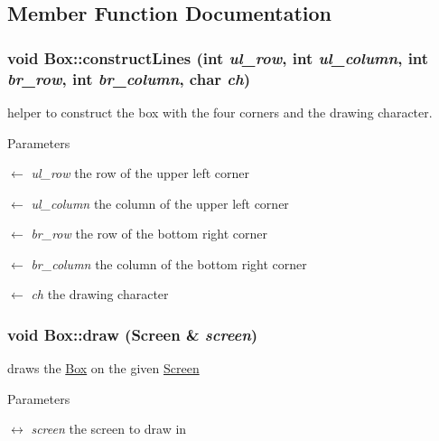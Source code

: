 \subsection{Member Function Documentation}
\hypertarget{classBox_a5411fa40529560030450d1eee001623d}{
\subsubsection[{constructLines}]{\setlength{\rightskip}{0pt plus 5cm}void Box::constructLines (int {\em ul\_\-row}, \/  int {\em ul\_\-column}, \/  int {\em br\_\-row}, \/  int {\em br\_\-column}, \/  char {\em ch})}}
\label{classBox_a5411fa40529560030450d1eee001623d}
helper to construct the box with the four corners and the drawing character.


\begin{DoxyParams}{Parameters}
\item[\mbox{$\leftarrow$} {\em ul\_\-row}]the row of the upper left corner \item[\mbox{$\leftarrow$} {\em ul\_\-column}]the column of the upper left corner \item[\mbox{$\leftarrow$} {\em br\_\-row}]the row of the bottom right corner \item[\mbox{$\leftarrow$} {\em br\_\-column}]the column of the bottom right corner \item[\mbox{$\leftarrow$} {\em ch}]the drawing character \end{DoxyParams}
\hypertarget{classBox_a5c6c1c650b13f2978e3b559bb5af15d2}{
\subsubsection[{draw}]{\setlength{\rightskip}{0pt plus 5cm}void Box::draw ({\bf Screen} \& {\em screen})}}
\label{classBox_a5c6c1c650b13f2978e3b559bb5af15d2}


draws the \hyperlink{classBox}{Box} on the given \hyperlink{classScreen}{Screen} 
\begin{DoxyParams}{Parameters}
\item[\mbox{$\leftrightarrow$} {\em screen}]the screen to draw in \end{DoxyParams}


